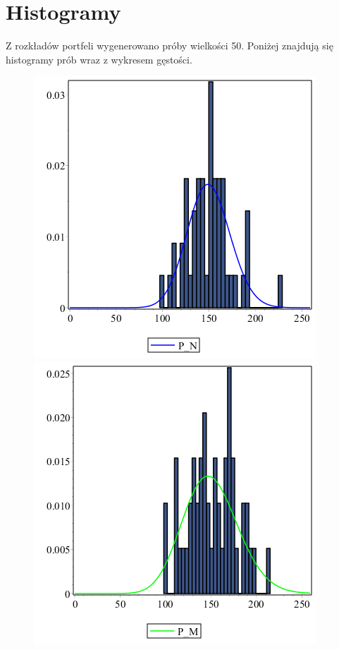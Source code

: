\documentclass[12pt]{article}
\theoremstyle{twierdzenie}
\theoremstyle{definition}
\begin{document}
\section{Histogramy}
Z rozkładów portfeli wygenerowano próby wielkości 50. Poniżej znajdują się histogramy prób wraz z wykresem gęstości. 
\begin{figure}[H]
\begin{center}
\includegraphics[scale=.5]{histN}
\includegraphics[scale=.5]{histM}

\end{center}
\end{figure}
\end{document}
